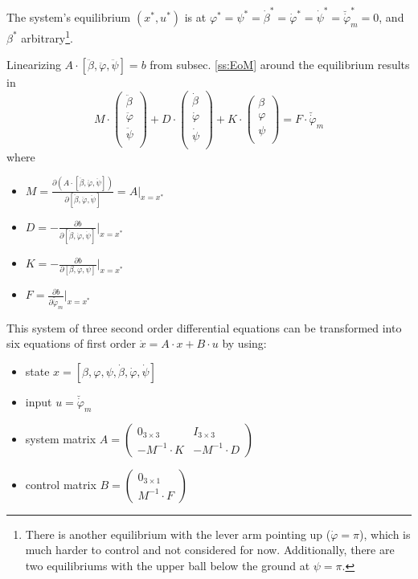 \documentclass{article}
\begin{document}
The system's equilibrium $(x^*, u^*)$ is at $\varphi^* = \psi^* = \dot{\beta}^* = \dot{\varphi}^* = \dot{\psi}^* = \breve{\dot{\varphi}}_m^* = 0$, and $\beta^*$ arbitrary\footnote{There is another equilibrium with the lever arm pointing up ($\dot{\varphi} = \pi$), which is much harder to control and not considered for now.
Additionally, there are two equilibriums with the upper ball below the ground at $\psi = \pi$.}.

Linearizing $A \cdot [\ddot{\beta}, \ddot{\varphi}, \ddot{\psi}] = b$ from subsec. \ref{ss:EoM} around the equilibrium results in
\begin{equation}
M \cdot \left( {\begin{array}{c} \ddot{\beta} \\ \ddot{\varphi} \\ \ddot{\psi} \\ \end{array} } \right) +
D \cdot \left( {\begin{array}{c} \dot{\beta} \\ \dot{\varphi} \\ \dot{\psi} \\ \end{array} } \right) +
K \cdot \left( {\begin{array}{c} \beta \\ \varphi \\ \psi \\ \end{array} } \right) =
F \cdot \breve{\dot{\varphi}}_m
\end{equation}
where
\begin{itemize}
	\item $M = \frac{\partial \left(A \cdot [\ddot{\beta}, \ddot{\varphi}, \ddot{\psi}] \right)}{\partial [\ddot{\beta}, \ddot{\varphi}, \ddot{\psi}]} = A\Big|_{x=x^*}$
	\item $D = -\frac{\partial b}{\partial [\dot{\beta}, \dot{\varphi}, \dot{\psi}]}\Big|_{x=x^*}$
	\item $K = -\frac{\partial b}{\partial [\beta, \varphi, \psi]}\Big|_{x=x^*}$
	\item $F = \frac{\partial b}{\partial \breve{\dot{\varphi}}_m}\Big|_{x=x^*}$
\end{itemize}
This system of three second order differential equations can be transformed into six equations of first order $\dot{x} = A \cdot x + B \cdot u$ by using:
\begin{itemize}
	\item state $x = [\beta, \varphi, \psi, \dot{\beta}, \dot{\varphi}, \dot{\psi}]$
	\item input $u = \breve{\dot{\varphi}}_m$
	\item system matrix $A = \left( {\begin{array}{cc} 0_{3 \times 3} & I_{3 \times 3} \\ -M^{-1} \cdot K & -M^{-1} \cdot D  \end{array} } \right)$
	\item control matrix $B = \left( {\begin{array}{c} 0_{3 \times 1} \\ M^{-1} \cdot F \end{array} } \right)$
\end{itemize}
\end{document}
